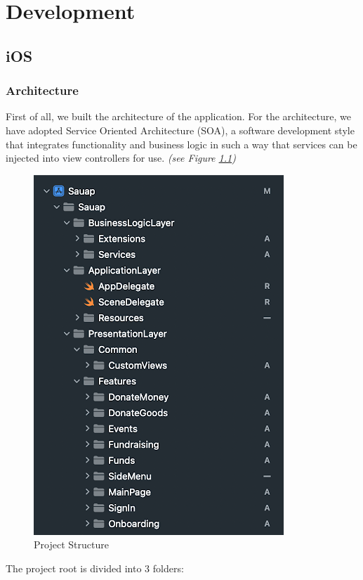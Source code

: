\chapter{Development}\label{ch:C}

\section{iOS}

\subsection{Architecture}

First of all, we built the architecture of the application. For the architecture, we have adopted Service Oriented Architecture (SOA), a software development style that integrates functionality and business logic in such a way that services can be injected into view controllers for use. \textit{(see Figure \ref{fig:ProjectStructure}) }

\begin{figure}[h]
    \centering
    \includegraphics[scale=0.4]{figures/iOS/ios1.png}
    \caption{Project Structure}
    \label{fig:ProjectStructure}
\end{figure}
The project root is divided into 3 folders:

